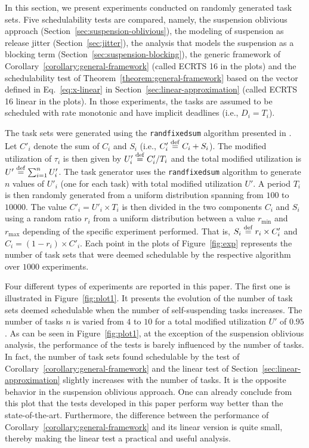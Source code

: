 In this section, we present experiments conducted on randomly generated task sets. Five schedulability tests are compared, namely, the suspension oblivious approach (Section~\ref{sec:suspension-oblivious}), the modeling of suspension as release jitter (Section~\ref{sec:jitter}), the analysis that models the suspension as a blocking term (Section~\ref{sec:suspension-blocking}), the generic framework of Corollary~\ref{corollary:general-framework} (called ECRTS 16 in the plots) and the schedulability test of Theorem~\ref{theorem:general-framework} based on the vector defined in Eq.~\eqref{eq:x-linear} in Section~\ref{sec:linear-approximation} (called ECRTS 16 linear in the plots). In those experiments, the tasks are assumed to be scheduled with rate monotonic and have implicit deadlines (i.e., $D_i = T_i$).

The task sets were generated using the \texttt{randfixedsum} algorithm presented in \cite{Emberson-taskSetGeneration-2010}. Let $C'_i$ denote the sum of $C_i$ and $S_i$ (i.e., $C'_i \stackrel{\mathrm{def}}{=} C_i + S_i$). 
The modified utilization of $\tau_i$ is then given by $U'_i \stackrel{\mathrm{def}}{=} C'_i/T_i$ and the total modified utilization is $U' \stackrel{\mathrm{def}}{=} \sum_{i=1}^n U'_i$. The task generator uses the \texttt{randfixedsum} algorithm to generate $n$ values of $U'_i$ (one for each task) with total modified utilization $U'$. A period $T_i$ is then randomly generated from a uniform distribution spanning from $100$ to $10000$. The value $C'_i = U'_i \times T_i$ is then divided in the two components $C_i$ and $S_i$ using a random ratio $r_i$ from a uniform distribution between a value $r_{\min}$ and $r_{\max}$ depending of the specific experiment performed. That is, $S_i \stackrel{\mathrm{def}}{=} r_i \times C'_i$ and $C_i = (1 - r_i) \times C'_i$. 
Each point in the plots of Figure~\ref{fig:exp} represents the number of task sets that were deemed schedulable by the respective algorithm over $1000$ experiments.

Four different types of experiments are reported in this paper. The first one is illustrated in Figure~\ref{fig:plot1}. It presents the evolution of the number of task sets deemed schedulable when the number of self-suspending tasks increases. The number of tasks $n$ is varied from $4$ to $10$ for a total modified utilization $U'$ of $0.95$. As can be seen in Figure~\ref{fig:plot1}, at the exception of the suspension oblivious analysis, the performance of the tests is barely influenced by the number of tasks. In fact, the number of task sets found schedulable by the test of Corollary~\ref{corollary:general-framework} and the linear test of Section~\ref{sec:linear-approximation} slightly increases with the number of tasks. It is the opposite behavior in the suspension oblivious approach. One can already conclude from this plot that the tests developed in this paper perform way better than the state-of-the-art. Furthermore, the difference between the performance of Corollary~\ref{corollary:general-framework} and its linear version is quite small, thereby making the linear test a practical and useful analysis.

